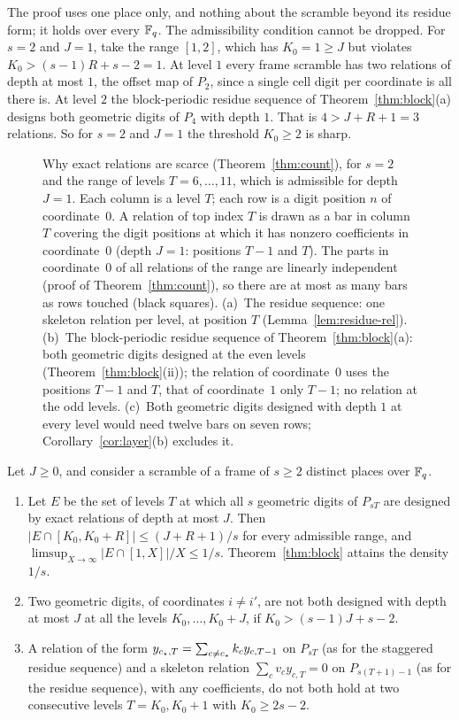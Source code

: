The proof uses one place only, and nothing about the scramble beyond its residue form; it holds over every $\mathbb{F}_q$. The admissibility condition cannot be dropped. For $s=2$ and $J=1$, take the range $[1,2]$, which has $K_0=1\ge J$ but violates $K_0>(s-1)R+s-2=1$. At level $1$ every frame scramble has two relations of depth at most $1$, the offset map of $P_2$, since a single cell digit per coordinate is all there is. At level $2$ the block-periodic residue sequence of Theorem~\ref{thm:block}(a) designs both geometric digits of $P_4$ with depth $1$. That is $4>J+R+1=3$ relations. So for $s=2$ and $J=1$ the threshold $K_0\ge2$ is sharp.

\begin{figure}[t]
\centering
{}
\caption{Why exact relations are scarce (Theorem~\ref{thm:count}), for $s=2$ and the range of levels $T=6,\dots,11$, which is admissible for depth $J=1$. Each column is a level $T$; each row is a digit position $n$ of coordinate~$0$. A relation of top index $T$ is drawn as a bar in column $T$ covering the digit positions at which it has nonzero coefficients in coordinate~$0$ (depth $J=1$: positions $T-1$ and $T$). The parts in coordinate~$0$ of all relations of the range are linearly independent (proof of Theorem~\ref{thm:count}), so there are at most as many bars as rows touched (black squares). (a)~The residue sequence: one skeleton relation per level, at position $T$ (Lemma~\ref{lem:residue-rel}). (b)~The block-periodic residue sequence of Theorem~\ref{thm:block}(a): both geometric digits designed at the even levels (Theorem~\ref{thm:block}(ii)); the relation of coordinate~$0$ uses the positions $T-1$ and $T$, that of coordinate~$1$ only $T-1$; no relation at the odd levels. (c)~Both geometric digits designed with depth $1$ at every level would need twelve bars on seven rows; Corollary~\ref{cor:layer}(b) excludes it.}
\label{fig:count}
\end{figure}

\begin{corollary}\label{cor:layer}
Let $J\ge0$, and consider a scramble of a frame of $s\ge2$ distinct places over $\mathbb{F}_q$.
\begin{enumerate}
\item[(a)] Let $E$ be the set of levels $T$ at which all $s$ geometric digits of $P_{sT}$ are designed by exact relations of depth at most $J$. Then $|E\cap[K_0,K_0+R]|\le(J+R+1)/s$ for every admissible range, and $\limsup_{X\to\infty}|E\cap[1,X]|/X\le1/s$. Theorem~\ref{thm:block} attains the density $1/s$.
\item[(b)] Two geometric digits, of coordinates $i\ne i'$, are not both designed with depth at most $J$ at all the levels $K_0,\dots,K_0+J$, if $K_0>(s-1)J+s-2$.
\item[(c)] A relation of the form $y_{c_{\star},T}=\sum_{c\ne c_{\star}}k_cy_{c,T-1}$ on $P_{sT}$ (as for the staggered residue sequence) and a skeleton relation $\sum_cv_cy_{c,T}=0$ on $P_{s(T+1)-1}$ (as for the residue sequence), with any coefficients, do not both hold at two consecutive levels $T=K_0,K_0+1$ with $K_0\ge2s-2$.
\end{enumerate}
\end{corollary}

